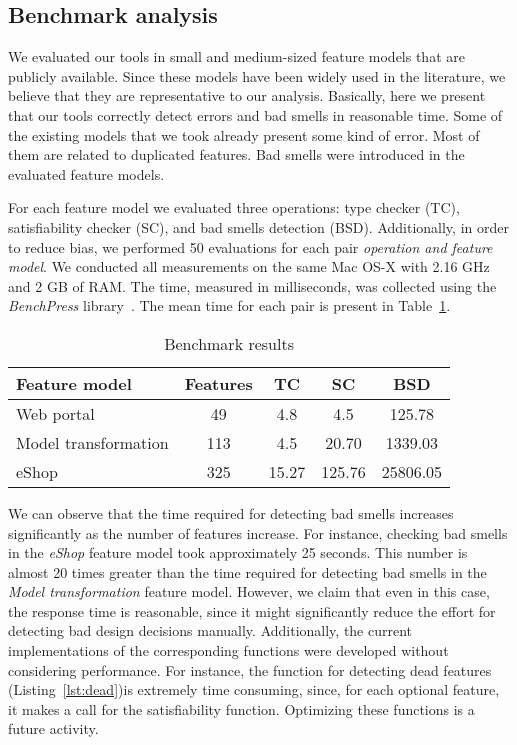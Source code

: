 \subsection{Benchmark analysis}

We evaluated our tools in small and medium-sized feature models that are publicly available. Since these models have been widely used in the literature, we believe that they are representative to our analysis. Basically, here we present  that our tools correctly detect errors and bad smells in reasonable time. Some of the existing models that we took already present some kind of error. Most of them are related to duplicated features. Bad smells were introduced in the evaluated feature models. 

For each feature model we evaluated three operations: type checker (TC), satisfiability checker (SC), and bad smells detection (BSD). Additionally, in order to reduce bias, we performed 50 evaluations for each pair \emph{operation and feature model}. We conducted all measurements on the same Mac OS-X with 2.16 GHz and 2 GB of RAM. The time, measured in milliseconds, was collected using the \emph{BenchPress} library~\cite{Tibell:2009rm}. The mean time for each pair is present in Table~\ref{tab:analysis}.

\begin{table}[htdp]
\begin{center}
\begin{tabular}{|l|c|c|c|c|} \hline
Feature model 			& Features 			& TC 	& SC 	& BSD      		\\ \hline
Web portal       			& 49                             	& 4.8 	& 4.5 	& 125.78 		\\ \hline
Model transformation       & 113			    	& 4.5	& 20.70	& 1339.03		\\ \hline 
eShop				& 325				& 15.27  	& 125.76	& 25806.05 	\\ \hline
\end{tabular}
\end{center}
\caption{Benchmark results}
\label{tab:analysis}
\end{table}

We can observe that the time required for detecting bad smells increases significantly as the number of features increase. For instance, checking bad smells in the \emph{eShop} feature model took approximately 25 seconds. This number is almost 20 times greater than the time required for detecting bad smells in the \emph{Model transformation} feature model. However, we claim that even in this case, the response time is reasonable, since it might significantly reduce the effort for detecting bad design decisions manually. Additionally, the current implementations of the corresponding functions were developed without considering performance. For instance, the function for detecting dead features (Listing~\ref{lst:dead})is extremely time consuming, since, for each optional feature, it makes a call for the satisfiability function. Optimizing these functions is a future activity. 

